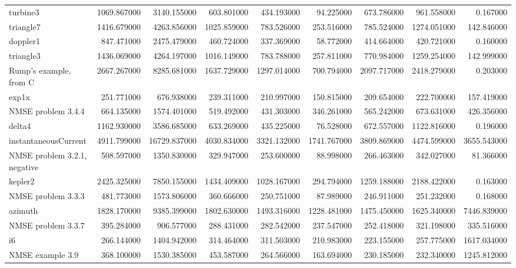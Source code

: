 \begin{longtable}{lrrrrrrrr}
turbine3 & 1069.867000 & 3140.155000 & 603.801000 & 434.193000 & 94.225000 & 673.786000 & 961.558000 & 0.167000 \\
triangle7 & 1416.679000 & 4263.856000 & 1025.859000 & 783.526000 & 253.516000 & 785.524000 & 1274.051000 & 142.846000 \\
doppler1 & 847.471000 & 2475.479000 & 460.724000 & 337.369000 & 58.772000 & 414.664000 & 420.721000 & 0.160000 \\
triangle3 & 1436.069000 & 4264.197000 & 1016.149000 & 783.788000 & 257.811000 & 770.984000 & 1259.254000 & 142.999000 \\
Rump's example, from C & 2667.267000 & 8285.681000 & 1637.729000 & 1297.014000 & 700.794000 & 2097.717000 & 2418.279000 & 0.203000 \\
exp1x & 251.771000 & 676.938000 & 239.311000 & 210.997000 & 150.815000 & 209.654000 & 222.700000 & 157.419000 \\
NMSE problem 3.4.4 & 664.135000 & 1574.401000 & 519.492000 & 431.303000 & 346.261000 & 565.242000 & 673.631000 & 426.356000 \\
delta4 & 1162.930000 & 3586.685000 & 633.269000 & 435.225000 & 76.528000 & 672.557000 & 1122.816000 & 0.196000 \\
instantaneousCurrent & 4911.799000 & 16729.837000 & 4030.834000 & 3321.132000 & 1741.767000 & 3809.869000 & 4474.599000 & 3655.543000 \\
NMSE problem 3.2.1, negative & 508.597000 & 1350.830000 & 329.947000 & 253.600000 & 88.998000 & 266.463000 & 342.027000 & 81.366000 \\
kepler2 & 2425.325000 & 7850.155000 & 1434.409000 & 1028.167000 & 294.794000 & 1259.188000 & 2188.422000 & 0.163000 \\
NMSE problem 3.3.3 & 481.773000 & 1573.806000 & 360.666000 & 250.751000 & 87.989000 & 246.911000 & 251.232000 & 0.168000 \\
azimuth & 1828.170000 & 9385.399000 & 1802.630000 & 1493.316000 & 1228.481000 & 1475.450000 & 1625.340000 & 7446.839000 \\
NMSE problem 3.3.7 & 395.284000 & 906.577000 & 288.431000 & 282.542000 & 237.547000 & 252.418000 & 321.198000 & 335.516000 \\
i6 & 266.144000 & 1404.942000 & 314.464000 & 311.503000 & 210.983000 & 223.155000 & 257.775000 & 1617.034000 \\
NMSE example 3.9 & 368.100000 & 1530.385000 & 453.587000 & 264.566000 & 163.694000 & 230.185000 & 232.340000 & 1245.812000 \\

\end{longtable}
